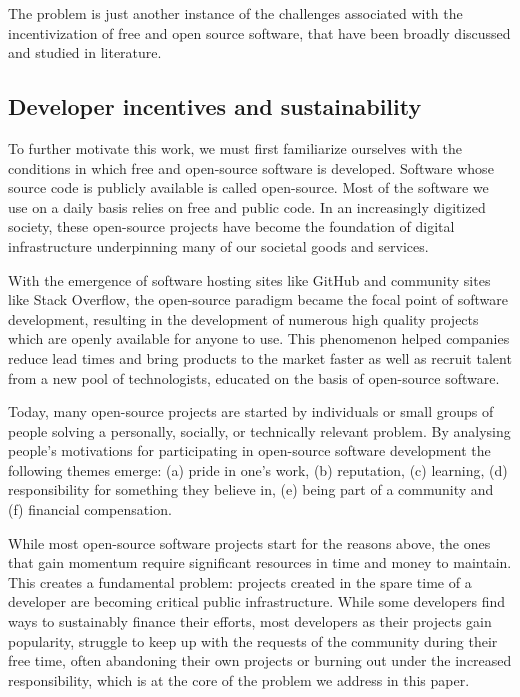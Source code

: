 The problem is just another instance of the challenges associated with the
incentivization of free and open source software, that have been broadly
discussed and studied in literature.

\subsection{Developer incentives and sustainability}

To further motivate this work, we must first familiarize ourselves with the
conditions in which free and open-source software is developed. Software whose
source code is publicly available is called open-source. Most of the software
we use on a daily basis relies on free and public code. In an increasingly
digitized society, these open-source projects have become the foundation of
digital infrastructure underpinning many of our societal goods and services.

With the emergence of software hosting sites like GitHub and community sites
like Stack Overflow, the open-source paradigm became the focal point of
software development, resulting in the development of numerous high quality
projects which are openly available for anyone to use. This phenomenon helped
companies reduce lead times and bring products to the market faster as well as
recruit talent from a new pool of technologists, educated on the basis of
open-source software.

Today, many open-source projects are started by individuals or small groups of
people solving a personally, socially, or technically relevant problem. By
analysing people's motivations for participating in open-source software
development the following themes emerge: (a) pride in one's work, (b)
reputation, (c) learning, (d) responsibility for something they believe in, (e)
being part of a community and (f) financial compensation.

While most open-source software projects start for the reasons above, the ones
that gain momentum require significant resources in time and money to maintain.
This creates a fundamental problem: projects created in the spare time of a
developer are becoming critical public infrastructure. While some developers
find ways to sustainably finance their efforts, most developers as their
projects gain popularity, struggle to keep up with the requests of the
community during their free time, often abandoning their own projects or
burning out under the increased responsibility,  which is at the core of the
problem we address in this paper.


